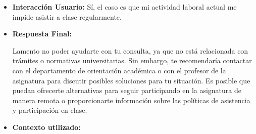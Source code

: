 \documentclass{article}
\begin{document}
\begin{itemize}
\begin{itemize}
                        Es recomendable que consultes con el profesor o coordinador de la asignatura para obtener más información sobre las opciones de evaluación continua disponibles y cómo se aplicarán en tu caso específico.
                  \item \textbf{Interacción Usuario:} Sí, el caso es que mi actividad laboral actual me impide asistir a clase regularmente.
                  \item \textbf{Respuesta Final:}

                        Lamento no poder ayudarte con tu consulta, ya que no está relacionada con trámites o normativas universitarias. Sin embargo, te recomendaría contactar con el departamento de orientación académica o con el profesor de la asignatura para discutir posibles soluciones para tu situación. Es posible que puedan ofrecerte alternativas para seguir participando en la asignatura de manera remota o proporcionarte información sobre las políticas de asistencia y participación en clase.
                  \item \textbf{Contexto utilizado:}

            \end{itemize}

\end{itemize}
\end{document}
